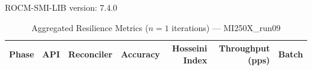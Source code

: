 ROCM-SMI-LIB version: 7.4.0

\begin{table}[htbp]
\caption{Aggregated Resilience Metrics ($n=1$ iterations) --- MI250X_run09}
\begin{tabular}{l l l r r r r}
\hline
Phase & API & Reconciler & Accuracy & Hosseini Index & Throughput (pps) & Batch \\
\hline
\hline
\end{tabular}
\end{table}
